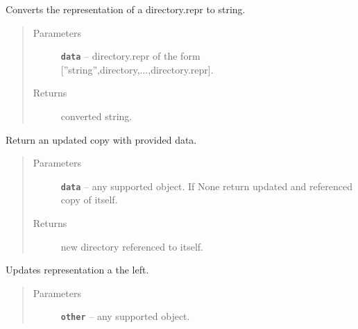 \documentclass[letterpaper,10pt,english]{sphinxmanual}
\begin{document}
\begin{fulllineitems}
\begin{fulllineitems}
\begin{quote}
\begin{description}
\end{description}\end{quote}

\end{fulllineitems}


\begin{fulllineitems}
\label{RRtoolbox.lib:RRtoolbox.lib.directory.directory.repr2str}
Converts the representation of a directory.repr to string.
\begin{quote}\begin{description}
\item[{Parameters}] \leavevmode
\textbf{\texttt{data}} -- directory.repr of the form {[}''string'',directory,...,directory.repr{]}.

\item[{Returns}] \leavevmode
converted string.

\end{description}\end{quote}

\end{fulllineitems}


\begin{fulllineitems}
\label{RRtoolbox.lib:RRtoolbox.lib.directory.directory.update}
Return an updated copy with provided data.
\begin{quote}\begin{description}
\item[{Parameters}] \leavevmode
\textbf{\texttt{data}} -- any supported object.
If None return updated and referenced copy of itself.

\item[{Returns}] \leavevmode
new directory referenced to itself.

\end{description}\end{quote}

\end{fulllineitems}


\begin{fulllineitems}
\label{RRtoolbox.lib:RRtoolbox.lib.directory.directory.update_left}
Updates representation a the left.
\begin{quote}\begin{description}
\item[{Parameters}] \leavevmode
\textbf{\texttt{other}} -- any supported object.


\end{description}
\end{quote}
\end{fulllineitems}
\end{fulllineitems}
\end{document}
